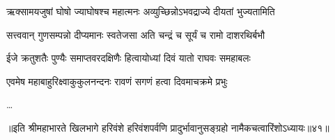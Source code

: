 \twolineshloka
{ऋक्सामयजुषां घोषो ज्याघोषश्च महात्मनः}
{अव्युच्छिन्नोऽभवद्राज्ये दीयतां भुज्यतामिति}%

\twolineshloka
{सत्त्ववान् गुणसम्पन्नो दीप्यमानः स्वतेजसा}
{अति चन्द्रं च सूर्यं च रामो दाशरथिर्बभौ}%

\twolineshloka
{ईजे क्रतुशतैः पुण्यैः समाप्तवरदक्षिणैः}
{हित्वायोध्यां दिवं यातो राघवः समहाबलः}%

\twolineshloka
{एवमेष महाबाहुरिक्ष्वाकुकुलनन्दनः}
{रावणं सगणं हत्वा दिवमाचक्रमे प्रभुः}%

\ldots

॥इति श्रीमहाभारते खिलभागे हरिवंशे हरिवंशपर्वणि प्रादुर्भावानुसङ्ग्रहो नामैकचत्वारिंशोऽध्यायः॥४१॥


\closesection